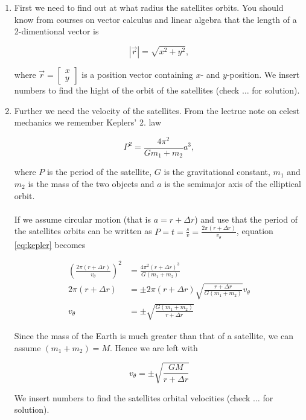 \documentclass[a4paper,10pt,english]{article}
\begin{document}
\begin{enumerate}

\item First we need to find out at what radius the satellites orbits. You should know from courses on vector calculus and linear algebra that the length of a 2-dimentional vector is

\[|\vec{r}|=\sqrt{x^{2}+y^{2}},\]

where $\vec{r}=\begin{bmatrix}x\\y\end{bmatrix}$ is a position vector containing $x$- and $y$-position. We insert numbers to find the hight of the orbit of the satellites (check $\ldots$ for solution).

\item Further we need the velocity of the satellites. From the lectrue note on celest mechanics we remember Keplers' 2. law 

\begin{equation}\label{eq:kepler}
P^{2}=\frac{4\pi^{2}}{Gm_{1}+m_{2}}a^{3},
\end{equation}

where $P$ is the period of the satellite, $G$ is the gravitational constant, $m_{1}$ and $m_{2}$ is the mass of the two objects and $a$ is the semimajor axis of the elliptical orbit.
\\
\\
If we assume circular motion (that is $a=r+\Delta r$) and use that the period of the satellites orbits can be written as $P=t=\frac{s}{v}=\frac{2\pi (r+\Delta r)}{v_{\theta}}$, equation \ref{eq:kepler} becomes

\begin{align*}
\left(\frac{2\pi (r+\Delta r)}{v_{\theta}}\right)^{2}&=\frac{4\pi^{2}(r+\Delta r)^{3}}{G(m_{1}+m_{2})}\\
2\pi (r+\Delta r)&=\pm2\pi (r+\Delta r)\sqrt{\frac{r+\Delta r}{G(m_{1}+m_{2})}}v_{\theta}\\
v_{\theta}&=\pm\sqrt{\frac{G(m_{1}+m_{2})}{r+\Delta r}}
\end{align*}

Since the mass of the Earth is much greater than that of a satellite, we can assume $(m_{1}+m_{2})=M$. Hence we are left with

\[v_{\theta}=\pm\sqrt{\frac{GM}{r+\Delta r}}\]

We insert numbers to find the satellites orbital velocities (check $\ldots$ for solution).




\end{enumerate}
\end{document}
